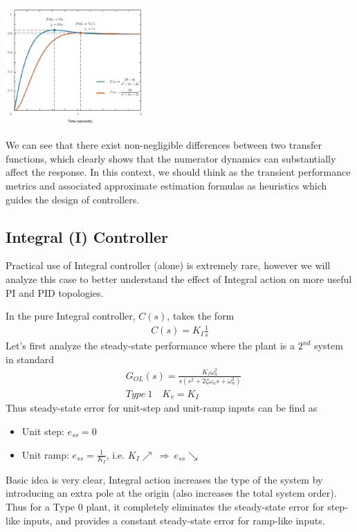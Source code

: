 \documentclass[twoside]{article}
\begin{document}
\vspace{12 pt}

  \begin{minipage}[h]{1\linewidth}
    \begin{center}
      \includegraphics[width=0.4\textwidth]{zero}
    \end{center}
  \end{minipage}

\vspace{12 pt}

We can see that there exist non-negligible differences
between two transfer functions, which clearly shows that
the numerator dynamics can substantially affect the response.
In this context, we should think as the transient performance
metrics and associated approximate estimation formulas 
as heuristics which guides the design of controllers. 

\subsection{Integral (I) Controller}

Practical use of Integral controller (alone) is extremely 
rare, however we will analyze this case to better
understand the effect of Integral action on more useful
PI and PID topologies. 

In the pure Integral controller, $C(s)$, takes the form
%
\begin{align*}
 C(s) = K_I \frac{1}{s}
\end{align*}
%
Let's first analyze the steady-state 
performance where the plant is a $2^{nd}$ system in standard
%
\begin{align*}
  &G_{OL}(s) = \frac{K_I \omega_n^2}{s (s^2 + 2 \zeta
    \omega_n s + \omega_n^2)}
\\
 &Type \ 1 \quad K_v = K_I
\end{align*}
% 
Thus steady-state error for unit-step and unit-ramp inputs can be find
as
\begin{itemize}
\item Unit step: $e_{ss} = 0$ 
\item Unit ramp: $e_{ss} = \frac{1}{K_I}$, i.e. $K_I \nearrow \ \Rightarrow \ e_{ss} \searrow$  
\end{itemize}
Basic idea is very clear, Integral action increases the type of the
system by introducing an extra pole at the origin (also increases the
total system order). Thus for a Type 0 plant, it completely eliminates 
the steady-state error for step-like inputs, and provides a
constant steady-state error for ramp-like inputs. 
\end{document}
